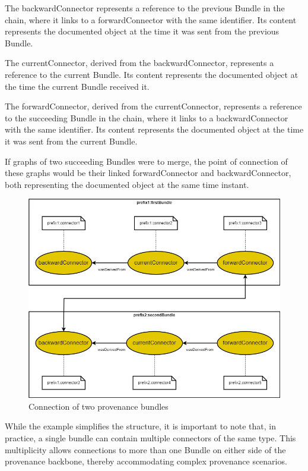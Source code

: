 \documentclass[
  digital,     %
  oneside,     %
  nosansbold,  %
  nocolorbold, %
  lof,         %
  lot,         %
]{fithesis4}
\begin{document}
The backwardConnector represents a reference to the previous Bundle in the chain, where it links to a forwardConnector with the same identifier. Its content represents the documented object at the time it was sent from the previous Bundle.

The currentConnector, derived from the backwardConnector, represents a reference to the current Bundle. Its content represents the documented object at the time the current Bundle received it.

The forwardConnector, derived from the currentConnector, represents a reference to the succeeding Bundle in the chain, where it links to a backwardConnector with the same identifier. Its content represents the documented object at the time it was sent from the current Bundle.

If graphs of two succeeding Bundles were to merge, the point of connection of these graphs would be their linked forwardConnector and backwardConnector, both representing the documented object at the same time instant. \cite{provchain}

\begin{figure}[htbp]
  \begin{center}
    \includegraphics[width=12.5cm]{fithesis/images/backbone.png}
  \end{center}
  \caption{Connection of two provenance bundles}
  \label{fig:bundleconnection}
\end{figure}

While the example simplifies the structure, it is important to note that, in practice, a single bundle can contain multiple connectors of the same type. This multiplicity allows connections to more than one Bundle on either side of the provenance backbone, thereby accommodating complex provenance scenarios.
\shorthandon{-}
\end{document}
